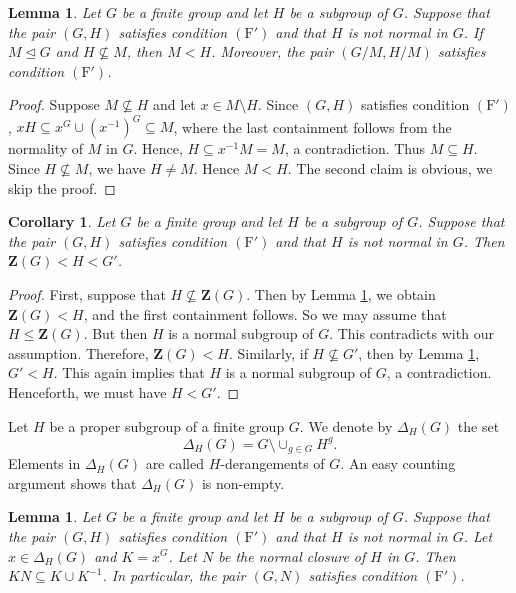 \documentclass[twoside,a4paper,reqno,11pt]{amsart}
\newcommand{\<}{\langle}
\renewcommand{\>}{\rangle}
\newcommand{\leqs}{\leqslant}
\newcommand{\z}{\mathbf{Z}}
\newcommand{\Fp}{\mathrm{(F')}}
\renewcommand{\leq}{\leqs}
\renewcommand{\:}{\colon}
\newtheorem{lem}[thm]{Lemma}
\newtheorem{cor}[thm]{Corollary}
\theoremstyle{definition}
\begin{document}
\begin{lem}\label{lemma18}
Let $G$ be a finite group and let $H$ be a subgroup of $G$.	Suppose that the pair $(G,H)$ satisfies condition $\Fp$ and that $H$ is not normal in $G$. If $M \unlhd G$ and $H\nsubseteq M$, then $M<H$. Moreover, the pair $(G/M, H/M)$ satisfies condition $\Fp$. 
\end{lem}
\begin{proof}
	Suppose $M\nsubseteq H$ and let $x\in M\setminus H$. Since $(G,H)$ satisfies condition $\Fp$, $xH\subseteq x^G\cup(x^{-1})^G \subseteq M$, where the last containment follows from the normality of $M$ in $G$. Hence, $H\subseteq x^{-1}M = M$, a contradiction. Thus $M\subseteq H$. Since $H\nsubseteq M$, we have $H\neq M$. Hence $M<H$.
	The second claim is obvious, we skip the proof.
\end{proof}

\begin{cor}\label{corol19}
Let $G$ be a finite group and let $H$ be a subgroup of $G$.	Suppose that the pair $(G,H)$ satisfies condition $\Fp$ and that $H$ is not normal in $G$. Then $\z(G) < H<G'$.
\end{cor}
\begin{proof}
	First, suppose that $H\nsubseteq \z(G)$. Then by Lemma \ref{lemma18}, we obtain $\z(G)< H$, and the first containment follows. So we may assume that $H\leq  \z(G)$. But then $H$ is a normal subgroup of $G$. This contradicts with our assumption. Therefore, $\z(G) < H$. Similarly, if $H\nsubseteq G'$, then by Lemma \ref{lemma18}, $G'<H$. This again implies that $H$ is a normal subgroup of $G$, a contradiction. Henceforth, we must have $H < G'$. 
\end{proof}

Let $H$ be a proper subgroup of a finite group $G$. We denote by $\Delta_H(G)$ the set $$\Delta_H(G)= G\setminus \cup_{g\in G}H^g.$$ Elements in $\Delta_H(G)$ are called $H$-derangements of $G$. An easy counting argument shows that $\Delta_H(G)$ is non-empty.  



\begin{lem}\label{lemma20}
Let $G$ be a finite group and let $H$ be a subgroup of $G$.	Suppose that the pair $(G,H)$ satisfies condition $\Fp$ and that $H$ is not normal in $G$. Let $x\in \Delta_H(G)$ and $K=x^G$. Let $N$ be the normal closure of $H$ in $G$. Then $KN \subseteq K\cup K^{-1}$. In particular, the pair $(G,N)$ satisfies condition $\Fp$.
\end{lem}
\end{document}
